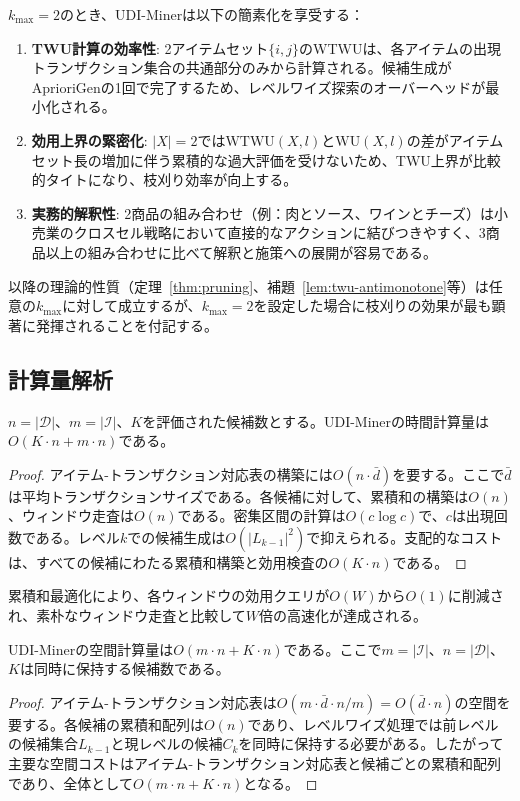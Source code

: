 \begin{property}[$L=2$における計算効率]
\label{prop:l2-efficiency}
$k_{\max} = 2$のとき、UDI-Minerは以下の簡素化を享受する：
\begin{enumerate}
    \item \textbf{TWU計算の効率性}: 2アイテムセット$\{i, j\}$のWTWUは、各アイテムの出現トランザクション集合の共通部分のみから計算される。候補生成がAprioriGenの1回で完了するため、レベルワイズ探索のオーバーヘッドが最小化される。
    \item \textbf{効用上界の緊密化}: $|X| = 2$では$\text{WTWU}(X, l)$と$\text{WU}(X, l)$の差がアイテムセット長の増加に伴う累積的な過大評価を受けないため、TWU上界が比較的タイトになり、枝刈り効率が向上する。
    \item \textbf{実務的解釈性}: 2商品の組み合わせ（例：肉とソース、ワインとチーズ）は小売業のクロスセル戦略において直接的なアクションに結びつきやすく、3商品以上の組み合わせに比べて解釈と施策への展開が容易である。
\end{enumerate}
\end{property}

\noindent
以降の理論的性質（定理~\ref{thm:pruning}、補題~\ref{lem:twu-antimonotone}等）は任意の$k_{\max}$に対して成立するが、$k_{\max} = 2$を設定した場合に枝刈りの効果が最も顕著に発揮されることを付記する。

\subsection{計算量解析}

\begin{theorem}[時間計算量]
$n = |\mathcal{D}|$、$m = |\mathcal{I}|$、$K$を評価された候補数とする。UDI-Minerの時間計算量は$O(K \cdot n + m \cdot n)$である。
\end{theorem}

\begin{proof}
アイテム-トランザクション対応表の構築には$O(n \cdot \bar{d})$を要する。ここで$\bar{d}$は平均トランザクションサイズである。各候補に対して、累積和の構築は$O(n)$、ウィンドウ走査は$O(n)$である。密集区間の計算は$O(c \log c)$で、$c$は出現回数である。レベル$k$での候補生成は$O(|L_{k-1}|^2)$で抑えられる。支配的なコストは、すべての候補にわたる累積和構築と効用検査の$O(K \cdot n)$である。
\end{proof}

累積和最適化により、各ウィンドウの効用クエリが$O(W)$から$O(1)$に削減され、素朴なウィンドウ走査と比較して$W$倍の高速化が達成される。

\begin{theorem}[空間計算量]
UDI-Minerの空間計算量は$O(m \cdot n + K \cdot n)$である。ここで$m = |\mathcal{I}|$、$n = |\mathcal{D}|$、$K$は同時に保持する候補数である。
\end{theorem}

\begin{proof}
アイテム-トランザクション対応表は$O(m \cdot \bar{d} \cdot n / m) = O(\bar{d} \cdot n)$の空間を要する。各候補の累積和配列は$O(n)$であり、レベルワイズ処理では前レベルの候補集合$L_{k-1}$と現レベルの候補$C_k$を同時に保持する必要がある。したがって主要な空間コストはアイテム-トランザクション対応表と候補ごとの累積和配列であり、全体として$O(m \cdot n + K \cdot n)$となる。
\end{proof}
